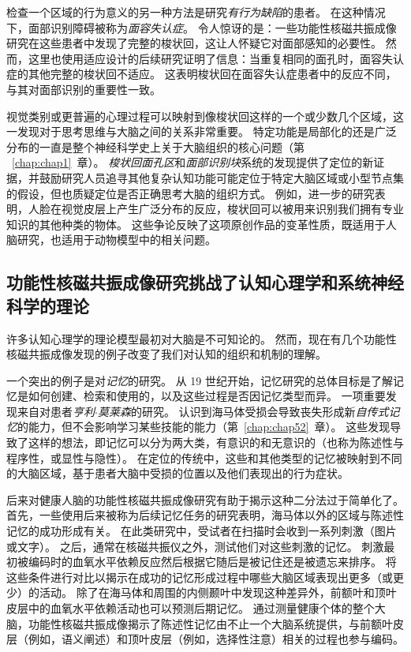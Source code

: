 检查一个区域的行为意义的另一种方法是研究\textit{有行为缺陷}的患者。
在这种情况下，面部识别障碍被称为\textit{面容失认症}。
令人惊讶的是：一些功能性核磁共振成像研究在这些患者中发现了完整的梭状回，这让人怀疑它对面部感知的必要性。 
然而，这里也使用适应设计的后续研究证明了信息：当重复相同的面孔时，面容失认症的其他完整的梭状回不适应。 
这表明梭状回在面容失认症患者中的反应不同，与其对面部识别的重要性一致。


视觉类别或更普遍的心理过程可以映射到像梭状回这样的一个或少数几个区域，这一发现对于思考思维与大脑之间的关系非常重要。
特定功能是局部化的还是广泛分布的一直是整个神经科学史上关于大脑组织的核心问题（第 ~\ref{chap:chap1}~章）。 
\textit{梭状回面孔区}和\textit{面部识别块}系统的发现提供了定位的新证据，并鼓励研究人员追寻其他复杂认知功能可能定位于特定大脑区域或小型节点集的假设，但也质疑定位是否正确思考大脑的组织方式。
例如，进一步的研究表明，人脸在视觉皮层上产生广泛分布的反应，梭状回可以被用来识别我们拥有专业知识的其他种类的物体。
这些争论反映了这项原创作品的变革性质，既适用于人脑研究，也适用于动物模型中的相关问题。



\subsection{功能性核磁共振成像研究挑战了认知心理学和系统神经科学的理论}

许多认知心理学的理论模型最初对大脑是不可知论的。 
然而，现在有几个功能性核磁共振成像发现的例子改变了我们对认知的组织和机制的理解。


一个突出的例子是对\textit{记忆}的研究。
从 19 世纪开始，记忆研究的总体目标是了解记忆是如何创建、检索和使用的，以及这些过程是否因记忆类型而异。 
一项重要发现来自对患者\textit{亨利$\cdot$莫莱森}的研究。 
认识到海马体受损会导致丧失形成新\textit{自传式记忆}的能力，但不会影响学习某些技能的能力（第~\ref{chap:chap52}~章）。
这些发现导致了这样的想法，即记忆可以分为两大类，有意识的和无意识的（也称为陈述性与程序性，或显性与隐性）。
在定位的传统中，这些和其他类型的记忆被映射到不同的大脑区域，基于患者大脑中受损的位置以及他们表现出的行为症状。


后来对健康人脑的功能性核磁共振成像研究有助于揭示这种二分法过于简单化了。
首先，一些使用后来被称为后续记忆任务的研究表明，海马体以外的区域与陈述性记忆的成功形成有关。
在此类研究中，受试者在扫描时会收到一系列刺激（图片或文字）。
之后，通常在核磁共振仪之外，测试他们对这些刺激的记忆。
刺激最初被编码时的血氧水平依赖反应然后根据它随后是被记住还是被遗忘来排序。
将这些条件进行对比以揭示在成功的记忆形成过程中哪些大脑区域表现出更多（或更少）的活动。
除了在海马体和周围的内侧颞叶中发现这种差异外，前额叶和顶叶皮层中的血氧水平依赖活动也可以预测后期记忆。 
通过测量健康个体的整个大脑，功能性核磁共振成像揭示了陈述性记忆由不止一个大脑系统提供，与前额叶皮层（例如，语义阐述）和顶叶皮层（例如，选择性注意）相关的过程也参与编码。


